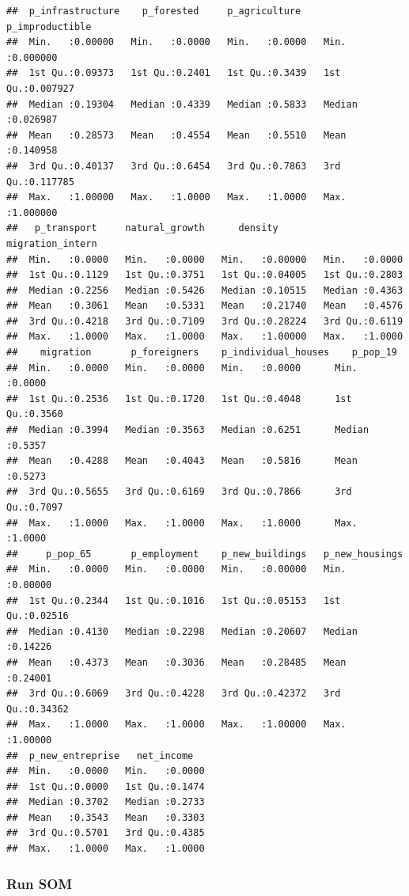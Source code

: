 \documentclass[
]{article}
\begin{document}
\begin{verbatim}
##  p_infrastructure    p_forested     p_agriculture    p_improductible   
##  Min.   :0.00000   Min.   :0.0000   Min.   :0.0000   Min.   :0.000000  
##  1st Qu.:0.09373   1st Qu.:0.2401   1st Qu.:0.3439   1st Qu.:0.007927  
##  Median :0.19304   Median :0.4339   Median :0.5833   Median :0.026987  
##  Mean   :0.28573   Mean   :0.4554   Mean   :0.5510   Mean   :0.140958  
##  3rd Qu.:0.40137   3rd Qu.:0.6454   3rd Qu.:0.7863   3rd Qu.:0.117785  
##  Max.   :1.00000   Max.   :1.0000   Max.   :1.0000   Max.   :1.000000  
##   p_transport     natural_growth      density        migration_intern
##  Min.   :0.0000   Min.   :0.0000   Min.   :0.00000   Min.   :0.0000  
##  1st Qu.:0.1129   1st Qu.:0.3751   1st Qu.:0.04005   1st Qu.:0.2803  
##  Median :0.2256   Median :0.5426   Median :0.10515   Median :0.4363  
##  Mean   :0.3061   Mean   :0.5331   Mean   :0.21740   Mean   :0.4576  
##  3rd Qu.:0.4218   3rd Qu.:0.7109   3rd Qu.:0.28224   3rd Qu.:0.6119  
##  Max.   :1.0000   Max.   :1.0000   Max.   :1.00000   Max.   :1.0000  
##    migration       p_foreigners    p_individual_houses    p_pop_19     
##  Min.   :0.0000   Min.   :0.0000   Min.   :0.0000      Min.   :0.0000  
##  1st Qu.:0.2536   1st Qu.:0.1720   1st Qu.:0.4048      1st Qu.:0.3560  
##  Median :0.3994   Median :0.3563   Median :0.6251      Median :0.5357  
##  Mean   :0.4288   Mean   :0.4043   Mean   :0.5816      Mean   :0.5273  
##  3rd Qu.:0.5655   3rd Qu.:0.6169   3rd Qu.:0.7866      3rd Qu.:0.7097  
##  Max.   :1.0000   Max.   :1.0000   Max.   :1.0000      Max.   :1.0000  
##     p_pop_65       p_employment    p_new_buildings   p_new_housings   
##  Min.   :0.0000   Min.   :0.0000   Min.   :0.00000   Min.   :0.00000  
##  1st Qu.:0.2344   1st Qu.:0.1016   1st Qu.:0.05153   1st Qu.:0.02516  
##  Median :0.4130   Median :0.2298   Median :0.20607   Median :0.14226  
##  Mean   :0.4373   Mean   :0.3036   Mean   :0.28485   Mean   :0.24001  
##  3rd Qu.:0.6069   3rd Qu.:0.4228   3rd Qu.:0.42372   3rd Qu.:0.34362  
##  Max.   :1.0000   Max.   :1.0000   Max.   :1.00000   Max.   :1.00000  
##  p_new_entreprise   net_income    
##  Min.   :0.0000   Min.   :0.0000  
##  1st Qu.:0.0000   1st Qu.:0.1474  
##  Median :0.3702   Median :0.2733  
##  Mean   :0.3543   Mean   :0.3303  
##  3rd Qu.:0.5701   3rd Qu.:0.4385  
##  Max.   :1.0000   Max.   :1.0000
\end{verbatim}

\subsubsection{Run SOM}\label{run-som}
\end{document}

